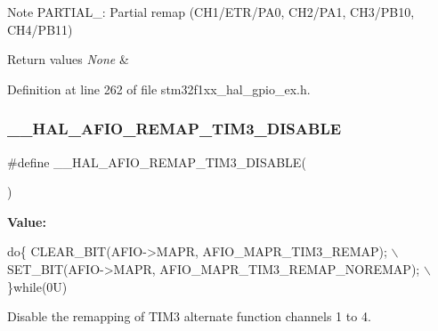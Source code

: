 \begin{DoxyNote}{Note}
P\+A\+R\+T\+I\+A\+L\+\_\+: Partial remap (C\+H1/\+E\+T\+R/\+P\+A0, C\+H2/\+P\+A1, C\+H3/\+P\+B10, C\+H4/\+P\+B11) 
\end{DoxyNote}

\begin{DoxyRetVals}{Return values}
{\em None} & \\
\hline
\end{DoxyRetVals}


Definition at line 262 of file stm32f1xx\+\_\+hal\+\_\+gpio\+\_\+ex.\+h.

\mbox{\label{group___g_p_i_o_ex___a_f_i_o___a_f___r_e_m_a_p_p_i_n_g_gade7c509d371e710403340173b3fbfecd}} 
\subsubsection{\texorpdfstring{\+\_\+\+\_\+\+H\+A\+L\+\_\+\+A\+F\+I\+O\+\_\+\+R\+E\+M\+A\+P\+\_\+\+T\+I\+M3\+\_\+\+D\+I\+S\+A\+B\+LE}{\_\_HAL\_AFIO\_REMAP\_TIM3\_DISABLE}}
{\footnotesize\ttfamily \#define \+\_\+\+\_\+\+H\+A\+L\+\_\+\+A\+F\+I\+O\+\_\+\+R\+E\+M\+A\+P\+\_\+\+T\+I\+M3\+\_\+\+D\+I\+S\+A\+B\+LE(\begin{DoxyParamCaption}{ }\end{DoxyParamCaption})}

{\bfseries Value\+:}
\begin{DoxyCode}
\textcolor{keywordflow}{do}\{ CLEAR\_BIT(AFIO->MAPR, AFIO\_MAPR\_TIM3\_REMAP);           \(\backslash\)
                                              SET\_BIT(AFIO->MAPR, AFIO\_MAPR\_TIM3\_REMAP\_NOREMAP);     \(\backslash\)
                                            \}\textcolor{keywordflow}{while}(0U)
\end{DoxyCode}


Disable the remapping of T\+I\+M3 alternate function channels 1 to 4. 

